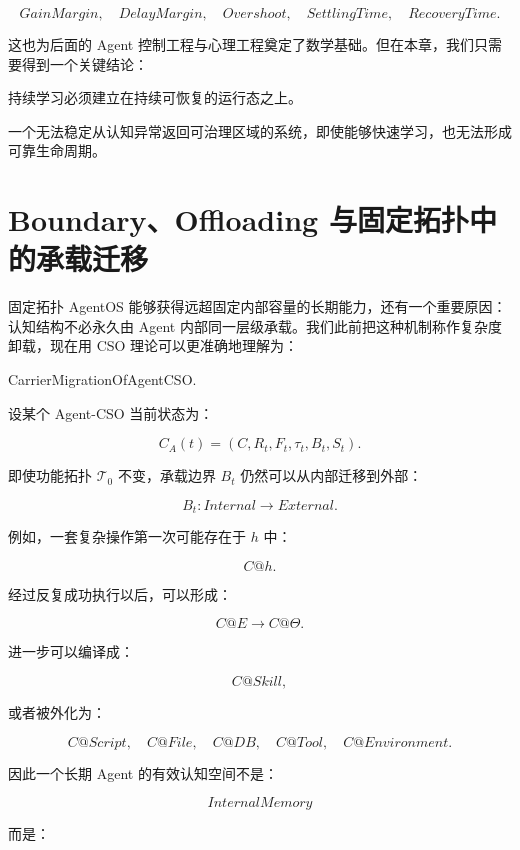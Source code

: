 \[
GainMargin,
\quad
DelayMargin,
\quad
Overshoot,
\quad
SettlingTime,
\quad
RecoveryTime.
\]

这也为后面的 Agent 控制工程与心理工程奠定了数学基础。但在本章，我们只需要得到一个关键结论：

\begin{conclusion}
持续学习必须建立在持续可恢复的运行态之上。
\end{conclusion}

一个无法稳定从认知异常返回可治理区域的系统，即使能够快速学习，也无法形成可靠生命周期。

\section{Boundary、Offloading 与固定拓扑中的承载迁移}

固定拓扑 AgentOS 能够获得远超固定内部容量的长期能力，还有一个重要原因：认知结构不必永久由 Agent 内部同一层级承载。我们此前把这种机制称作复杂度卸载，现在用 CSO 理论可以更准确地理解为：

\begin{statementbox}
CarrierMigrationOfAgentCSO.
\end{statementbox}

设某个 Agent-CSO 当前状态为：

\[
C_A(t)
=
(C,R_t,F_t,\tau_t,B_t,S_t).
\]

即使功能拓扑 $\mathcal{T}_0$ 不变，承载边界 $B_t$ 仍然可以从内部迁移到外部：

\[
B_t:
Internal
\rightarrow
External.
\]

例如，一套复杂操作第一次可能存在于 $h$ 中：

\[
C@h.
\]

经过反复成功执行以后，可以形成：

\[
C@E
\rightarrow
C@\Theta.
\]

进一步可以编译成：

\[
C@Skill,
\]

或者被外化为：

\[
C@Script,
\quad
C@File,
\quad
C@DB,
\quad
C@Tool,
\quad
C@Environment.
\]

因此一个长期 Agent 的有效认知空间不是：

\[
InternalMemory
\]

而是：

\begin{statementbox}
\centering
{}
\end{statementbox}

